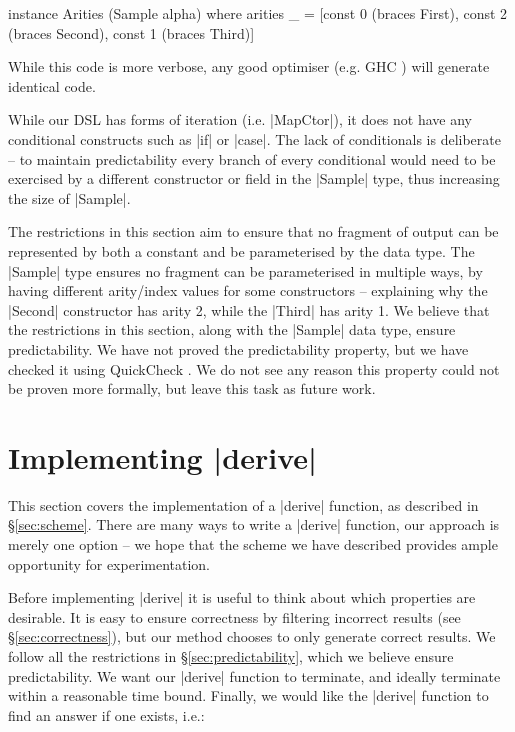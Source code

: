 \documentclass{llncs}
\begin{document}
\begin{code}
instance Arities (Sample alpha) where
    arities _ = [const 0 (braces First), const 2 (braces Second), const 1 (braces Third)]
\end{code}

While this code is more verbose, any good optimiser (e.g. GHC \cite{ghc6_10}) will generate identical code.

While our DSL has forms of iteration (i.e. |MapCtor|), it does not have any conditional constructs such as |if| or |case|. The lack of conditionals is deliberate -- to maintain predictability every branch of every conditional would need to be exercised by a different constructor or field in the |Sample| type, thus increasing the size of |Sample|.

The restrictions in this section aim to ensure that no fragment of output can be represented by both a constant and be parameterised by the data type. The |Sample| type ensures no fragment can be parameterised in multiple ways, by having different arity/index values for some constructors -- explaining why the |Second| constructor has arity 2, while the |Third| has arity 1. We believe that the restrictions in this section, along with the |Sample| data type, ensure predictability. We have not proved the predictability property, but we have checked it using QuickCheck \cite{quickcheck}. We do not see any reason this property could not be proven more formally, but leave this task as future work.

\section{Implementing |derive|}
\label{sec:guess}

This section covers the implementation of a |derive| function, as described in \S\ref{sec:scheme}. There are many ways to write a |derive| function, our approach is merely one option -- we hope that the scheme we have described provides ample opportunity for experimentation.

Before implementing |derive| it is useful to think about which properties are desirable. It is easy to ensure correctness by filtering incorrect results (see \S\ref{sec:correctness}), but our method chooses to only generate correct results. We follow all the restrictions in \S\ref{sec:predictability}, which we believe ensure predictability. We want our |derive| function to terminate, and ideally terminate within a reasonable time bound. Finally, we would like the |derive| function to find an answer if one exists, i.e.:
\end{document}
